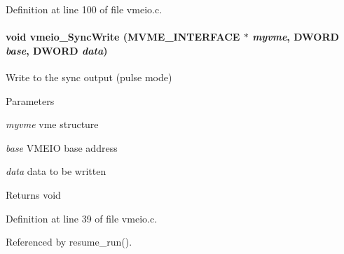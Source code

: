 Definition at line 100 of file vmeio.c.
\paragraph[{vmeio\_\-SyncWrite}]{\setlength{\rightskip}{0pt plus 5cm}void vmeio\_\-SyncWrite ({\bf MVME\_\-INTERFACE} $\ast$ {\em myvme}, \/  {\bf DWORD} {\em base}, \/  {\bf DWORD} {\em data})}\hfill\label{vmeio_8c_a703cba2e78c649e71061f29f56aea517}
Write to the sync output (pulse mode) 
\begin{DoxyParams}{Parameters}
\item[{\em myvme}]vme structure \item[{\em base}]VMEIO base address \item[{\em data}]data to be written \end{DoxyParams}
\begin{DoxyReturn}{Returns}
void 
\end{DoxyReturn}


Definition at line 39 of file vmeio.c.

Referenced by resume\_\-run().